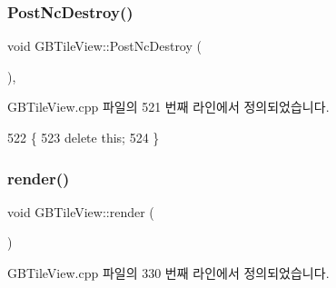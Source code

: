 \subsubsection{\texorpdfstring{Post\+Nc\+Destroy()}{PostNcDestroy()}}
{\footnotesize\ttfamily void G\+B\+Tile\+View\+::\+Post\+Nc\+Destroy (\begin{DoxyParamCaption}{ }\end{DoxyParamCaption})\hspace{0.3cm}{\ttfamily [protected]}, {\ttfamily [virtual]}}



G\+B\+Tile\+View.\+cpp 파일의 521 번째 라인에서 정의되었습니다.


\begin{DoxyCode}
522 \{
523   \textcolor{keyword}{delete} \textcolor{keyword}{this};
524 \}
\end{DoxyCode}
\mbox{\label{class_g_b_tile_view_a1012b77fed7304d7b27b9d619472e6a7}} 
\subsubsection{\texorpdfstring{render()}{render()}}
{\footnotesize\ttfamily void G\+B\+Tile\+View\+::render (\begin{DoxyParamCaption}{ }\end{DoxyParamCaption})}



G\+B\+Tile\+View.\+cpp 파일의 330 번째 라인에서 정의되었습니다.


